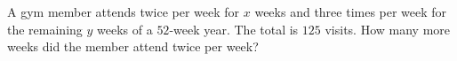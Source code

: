 A gym member attends twice per week for $x$ weeks and three times per week for the remaining $y$ weeks of a $52$-week year. The total is $125$ visits. How many more weeks did the member attend twice per week?
